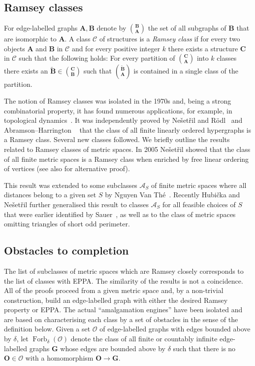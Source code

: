 \documentclass[11pt]{amsart}
\def\Forb{\mathop{\mathrm{Forb}}\nolimits}
\def\str#1{\mathbf {#1}}
\begin{document}
\subsection{Ramsey classes}\label{sec:RC}
For edge-labelled graphs $\str{A},\str{B}$ denote by ${\str{B}\choose \str{A}}$ the set
of all subgraphs of $\str{B}$ that are isomorphic to $\str{A}$.   A class
$\mathcal C$ of structures is a \emph{Ramsey class} if for every two objects $\str{A}$ and
$\str{B}$ in $\mathcal C$ and for every positive integer $k$ there exists a
structure $\str{C}$ in $\mathcal C$ such that the following holds: For every
partition of ${\str{C}\choose \str{A}}$ into $k$ classes there exists an
$\widetilde{\str B} \in {\str{C}\choose \str{B}}$ such that
${\widetilde{\str{B}}\choose \str{A}}$ is contained in a single class of the partition.

The notion of Ramsey classes was isolated in the 1970s and, being a
strong combinatorial property, it has found numerous applications, for example,
in topological dynamics~\cite{Kechris2005}.
It was independently proved by Ne\v set\v ril and R\"odl~\cite{Nevsetvril1976}
and Abramson--Harrington ~\cite{Abramson1978}
 that the class of all finite linearly ordered
hypergraphs is a Ramsey class. Several new classes followed.  We briefly outline the results
related to Ramsey classes of metric spaces.
In 2005 Ne\v set\v ril \cite{Nevsetvril2007} showed that the class of all finite
metric spaces   is a
Ramsey class when enriched by free linear ordering of vertices (see also \cite{masulovic2016pre} for alternative proof).

 This result was
extended to some subclasses $\mathcal A_S$ of finite metric spaces where all
distances belong to a given set $S$ by Nguyen Van Th{\'e}~\cite{The2010}.
Recently Hubi\v cka and Ne\v set\v ril further generalised this result to classes $\mathcal A _S$
for all feasible choices of $S$~\cite{Hubicka2016}
  that were earlier identified by Sauer~\cite{Sauer2013},
as well as to the class of metric spaces omitting triangles of short odd perimeter.

\subsection{Obstacles to completion}

The list of subclasses of metric spaces which are Ramsey closely corresponds to
the list of classes with EPPA. The similarity of the results is not a coincidence.  All of the
proofs proceed from a given metric space and, by a non-trivial construction, build
an edge-labelled graph with either the desired Ramsey property or EPPA.
The actual ``amalgamation engines'' have been isolated and
are based on characterising each class by a set of obstacles in the sense of the definition below.
Given a set $\mathcal O$ of edge-labelled graphs with edges bounded above by $\delta$, let $\Forb_{\delta}(\mathcal O)$ denote the class
of all finite or countably infinite edge-labelled graphs $\str{G}$ whose edges are bounded above by $\delta$ such that there is no $\str{O}\in \mathcal O$ with a homomorphism
$\str{O}\to \str{G}$.
\end{document}

